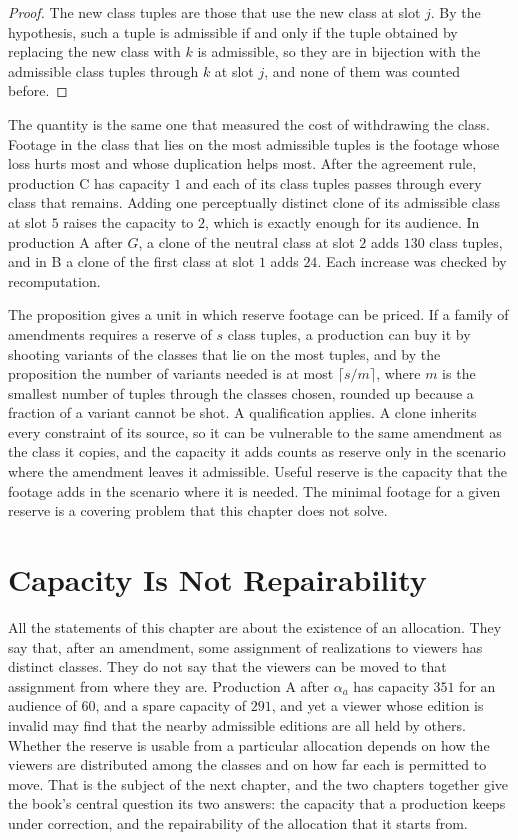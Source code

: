 \documentclass[11pt,twoside,openright]{book}
\theoremstyle{plain}
\theoremstyle{definition}
\theoremstyle{remark}
\begin{document}
\begin{proof}
The new class tuples are those that use the new class at slot $j$. By the hypothesis, such a tuple is admissible if and only if the tuple obtained by replacing the new class with $k$ is admissible, so they are in bijection with the admissible class tuples through $k$ at slot $j$, and none of them was counted before.
\end{proof}

The quantity is the same one that measured the cost of withdrawing the class. Footage in the class that lies on the most admissible tuples is the footage whose loss hurts most and whose duplication helps most. After the agreement rule, production C has capacity $1$ and each of its class tuples passes through every class that remains. Adding one perceptually distinct clone of its admissible class at slot $5$ raises the capacity to $2$, which is exactly enough for its audience. In production A after $G$, a clone of the neutral class at slot $2$ adds $130$ class tuples, and in B a clone of the first class at slot $1$ adds $24$. Each increase was checked by recomputation.

The proposition gives a unit in which reserve footage can be priced. If a family of amendments requires a reserve of $s$ class tuples, a production can buy it by shooting variants of the classes that lie on the most tuples, and by the proposition the number of variants needed is at most $\lceil s/m\rceil$, where $m$ is the smallest number of tuples through the classes chosen, rounded up because a fraction of a variant cannot be shot. A qualification applies. A clone inherits every constraint of its source, so it can be vulnerable to the same amendment as the class it copies, and the capacity it adds counts as reserve only in the scenario where the amendment leaves it admissible. Useful reserve is the capacity that the footage adds in the scenario where it is needed. The minimal footage for a given reserve is a covering problem that this chapter does not solve.

\section{Capacity Is Not Repairability}\label{sec:notrepair}

All the statements of this chapter are about the existence of an allocation. They say that, after an amendment, some assignment of realizations to viewers has distinct classes. They do not say that the viewers can be moved to that assignment from where they are. Production A after $\alpha_a$ has capacity $351$ for an audience of $60$, and a spare capacity of $291$, and yet a viewer whose edition is invalid may find that the nearby admissible editions are all held by others. Whether the reserve is usable from a particular allocation depends on how the viewers are distributed among the classes and on how far each is permitted to move. That is the subject of the next chapter, and the two chapters together give the book's central question its two answers: the capacity that a production keeps under correction, and the repairability of the allocation that it starts from.
\end{document}
